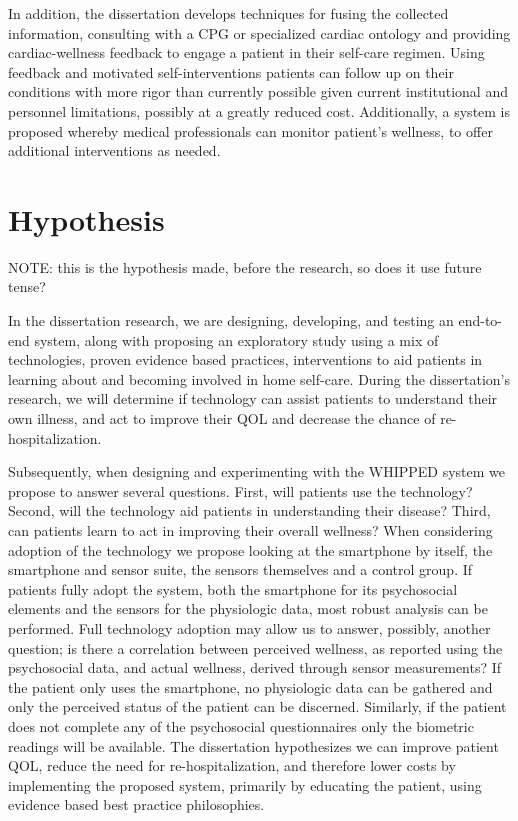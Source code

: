 In addition, the dissertation develops techniques for fusing the collected information, consulting with a CPG or specialized cardiac ontology and providing cardiac-wellness feedback to engage a patient in their self-care regimen. Using feedback and motivated self-interventions patients can follow up on their conditions with more rigor than currently possible given current institutional and personnel limitations, possibly at a greatly reduced cost. Additionally, a system is proposed whereby medical professionals can monitor patient's wellness, to offer additional interventions as needed.

\section{Hypothesis}
\label{sec:Hypothesis} 

NOTE: this is the hypothesis made, before the research, so does it use future tense?

In the dissertation research, we are designing, developing, and testing an end-to-end system, along with proposing an exploratory study using a mix of technologies, proven evidence based practices, interventions to aid patients in learning about and becoming involved in home self-care. During the dissertation's research, we will determine if technology can assist patients to understand their own illness, and act to improve their QOL and decrease the chance of re-hospitalization. 

Subsequently, when designing and experimenting with the WHIPPED system we propose to answer several questions. First, will patients use the technology? Second, will the technology aid patients in understanding their disease?  Third, can patients learn to act in improving their overall wellness? When considering adoption of the technology we propose looking at the smartphone by itself, the smartphone and sensor suite, the sensors themselves and a control group. If patients fully adopt the system, both the smartphone for its psychosocial elements and the sensors for the physiologic data, most robust analysis can be performed. Full technology adoption may allow us to answer, possibly, another question; is there a correlation between perceived wellness, as reported using the psychosocial data, and actual wellness, derived through sensor measurements? If the patient only uses the smartphone, no physiologic data can be gathered and only the perceived status of the patient can be discerned. Similarly, if the patient does not complete any of the psychosocial questionnaires only the biometric readings will be available. The dissertation hypothesizes we can improve patient QOL, reduce the need for re-hospitalization, and therefore lower costs by implementing the proposed system, primarily by educating the patient, using evidence based best practice philosophies.


